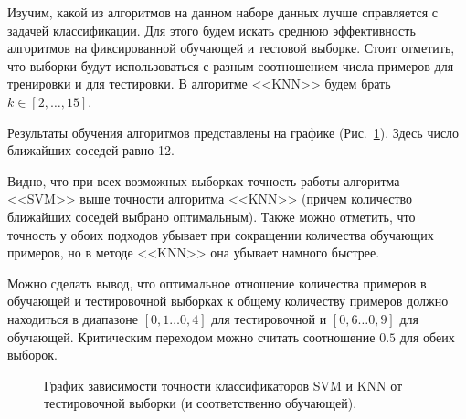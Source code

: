 \documentclass[12pt, a4paper]{article}
\begin{document}
    Изучим, какой из алгоритмов на данном наборе данных лучше справляется с задачей 
    классификации. Для этого будем искать среднюю эффективность алгоритмов на 
    фиксированной обучающей и тестовой выборке. Стоит отметить, что выборки будут 
    использоваться с разным соотношением числа примеров для тренировки и для 
    тестировки. В алгоритме <<KNN>> будем брать $k \in [2, \ldots, 15]$. 
    
    Результаты обучения алгоритмов представлены на графике (Рис.~\ref{image5}). Здесь 
    число ближайших соседей равно 12.
    
    Видно, что при всех возможных выборках точность работы алгоритма <<SVM>> выше 
    точности алгоритма <<KNN>> (причем количество ближайших соседей выбрано 
    оптимальным). Также можно отметить, что точность у обоих подходов убывает при 
    сокращении количества обучающих примеров, но в методе <<KNN>> она убывает намного 
    быстрее.
    
    Можно сделать вывод, что оптимальное отношение количества примеров в обучающей и 
    тестировочной выборках к общему количеству примеров должно находиться в диапазоне 
    $[0,1 \ldots 0,4]$ для тестировочной и $[0,6 \ldots 0,9]$ для обучающей. 
    Критическим переходом можно считать соотношение $0.5$ для обеих выборок.
    
    \begin{figure} [h]
        \caption{График зависимости точности классификаторов SVM и KNN от 
                 тестировочной выборки (и соответственно обучающей).}
        \label{image5}
    \end{figure}
    
\end{document}
